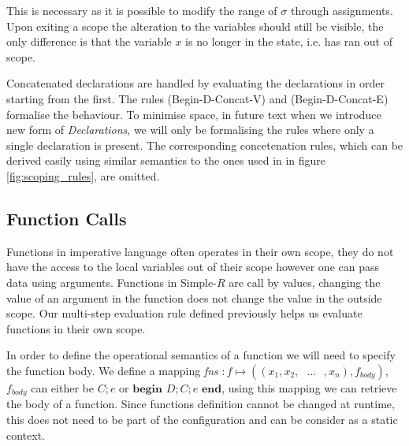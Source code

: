 \documentclass[a4paper,12pt]{report}
\begin{document}
\par
This is necessary as it is possible to modify the range of $\sigma$ through 
assignments. Upon exiting a scope the alteration to the variables  
should still be visible, the only difference is that the variable $x$ is no longer in 
the state, i.e. has ran out of scope.

\par
Concatenated declarations are handled by evaluating the declarations in order 
starting from the first. The rules (Begin-D-Concat-V) and (Begin-D-Concat-E) 
formalise the behaviour. To minimise space, in future text when we 
introduce new form of \textit{Declarations}, we will only 
be formalising the rules where only a single declaration is present. The 
corresponding concetenation rules, which can be derived easily using  
similar semantics to the ones used in in figure \ref{fig:scoping_rules}, 
are omitted.

\subsection{Function Calls} \label{section:functions_sos}
Functions in imperative language often operates in their own scope, they 
do not have the access to the local variables out of their scope however 
one can pass data using arguments. Functions in Simple-$R$ are call by values, 
changing the value of an argument in the function does not change the value in 
the outside scope. Our multi-step evaluation rule defined previously helps us 
evaluate functions in their own scope. 

\par
In order to define the operational semantics of a function we will need to 
specify the function body. We define a mapping 
\textit{fns} $: f \mapsto ((x_1, x_2,\text{ }...\text{ },x_n), f_{body})$, 
$f_{body}$ can either be $C;e$ or $\textbf{begin }D;C;e\textbf{ end}$, 
using this mapping we can retrieve the body of a function. Since functions 
definition cannot be changed at runtime, this does not need to be part of the 
configuration and can be consider as a static context.
\end{document}
